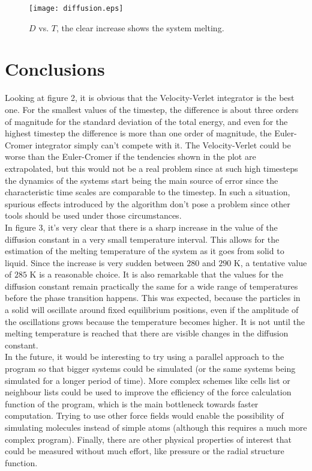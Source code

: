 \documentclass[11pt,a4paper,oneside]{article}
\begin{document}
		\begin{figure}[ht!]\begin{center}\texttt{[image: diffusion.eps]}\par\protect\caption{\scriptsize $D$ vs. $T$, the clear increase shows the system melting.}\end{center}\end{figure}
		
	\section{Conclusions}
	
		Looking at figure 2, it is obvious that the Velocity-Verlet integrator is the best one. For the smallest values of the timestep, the difference is about three orders of magnitude for the standard deviation of the total energy, and even for the highest timestep the difference is more than one order of magnitude, the Euler-Cromer integrator simply can't compete with it. The Velocity-Verlet could be worse than the Euler-Cromer if the tendencies shown in the plot are extrapolated, but this would not be a real problem since at such high timesteps the dynamics of the systems start being the main source of error since the characteristic time scales are comparable to the timestep. In such a situation, spurious effects introduced by the algorithm don't pose a problem since other tools should be used under those circumstances.\\
		
		In figure 3, it's very clear that there is a sharp increase in the value of the diffusion constant in a very small temperature interval. This allows for the estimation of the melting temperature of the system as it goes from solid to liquid. Since the increase is very sudden between $280$ and $290$ K, a tentative value of $285$ K is a reasonable choice. It is also remarkable that the values for the diffusion constant remain practically the same for a wide range of temperatures before the phase transition happens. This was expected, because the particles in a solid will oscillate around fixed equilibrium positions, even if the amplitude of the oscillations grows because the temperature becomes higher. It is not until the melting temperature is reached that there are visible changes in the diffusion constant.\\
	
		In the future, it would be interesting to try using a parallel approach to the program so that bigger systems could be simulated (or the same systems being simulated for a longer period of time). More complex schemes like cells list or neighbour lists could be used to improve the efficiency of the force calculation function of the program, which is the main bottleneck towards faster computation. Trying to use other force fields would enable the possibility of simulating molecules instead of simple atoms (although this requires a much more complex program). Finally, there are other physical properties of interest that could be measured without much effort, like pressure or the radial structure function.\\
	
\end{document}
